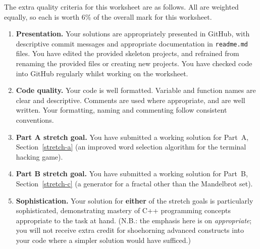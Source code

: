 \documentclass{scrartcl}
\begin{document}
The extra quality criteria for this worksheet are as follows. All are weighted equally, so each is worth $6\%$ of the overall mark for this worksheet.
\begin{enumerate}
\item\textbf{Presentation.} Your solutions are appropriately presented in GitHub, with descriptive commit messages
	and appropriate documentation in \texttt{readme.md} files.
	You have edited the provided skeleton projects, and refrained from renaming the provided files or creating new projects.
    You have checked code into GitHub regularly whilst working on the worksheet.
\item\textbf{Code quality.} Your code is well formatted.
    Variable and function names are clear and descriptive.
    Comments are used where appropriate, and are well written.
    Your formatting, naming and commenting follow consistent conventions.
\item\textbf{Part A stretch goal.} You have submitted a working solution for Part~A, Section~\ref{stretch-a} (an improved word selection algorithm for the terminal hacking game).
\item\textbf{Part B stretch goal.} You have submitted a working solution for Part~B, Section~\ref{stretch-c} (a generator for a fractal other than the Mandelbrot set).
\item\textbf{Sophistication.} Your solution for \textbf{either} of the stretch goals is particularly sophisticated,
	demonstrating mastery of C++ programming concepts appropriate to the task at hand.
    (N.B.: the emphasis here is on \emph{appropriate}; you will not receive extra credit for shoehorning advanced constructs into your code where a simpler solution would have sufficed.)
\end{enumerate}

\clearpage


%

\clearpage

\end{document}
